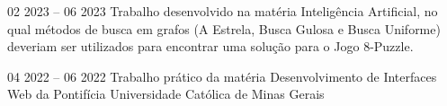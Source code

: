 \documentclass[10pt,a4paper,ragged2e,withhyper]{altacv}
\begin{document}
\begin{paracol}{2}
            {
            }{02 2023 -- 06 2023}{}
            Trabalho desenvolvido na matéria Inteligência Artificial, no qual métodos de busca em grafos (A Estrela, Busca Gulosa e Busca Uniforme) deveriam ser utilizados para encontrar uma solução para o Jogo 8-Puzzle.\\
            \divider
            
            {
            }{04 2022 -- 06 2022}{}
            Trabalho prático da matéria Desenvolvimento de Interfaces Web da Pontifícia Universidade Católica de Minas Gerais
    \end{paracol}
\end{document}
